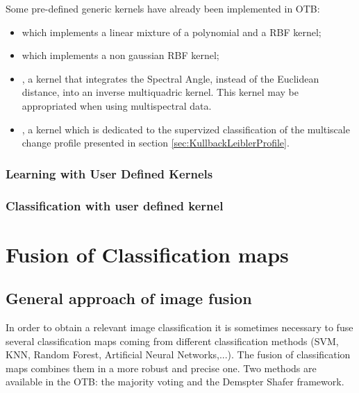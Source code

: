 Some pre-defined generic kernels have already been implemented in OTB:
\begin{itemize}
\item {} which implements a 
linear mixture
of a polynomial and a RBF kernel;
\item {} which implements a non
gaussian RBF kernel;
\item {}, a kernel that integrates
the Spectral Angle, instead of the Euclidean distance, into an inverse 
multiquadric kernel.
This kernel may be appropriated when using multispectral data.
\item {}, a kernel which is
dedicated to the supervized classification of the multiscale change profile
presented in section \ref{sec:KullbackLeiblerProfile}.
\end{itemize}

\subsubsection{Learning with User Defined Kernels}
\label{sec:Learningwithuserdefinedkernel}
\ifitkFullVersion

\fi

\subsubsection{Classification with user defined kernel}

\ifitkFullVersion

\fi




\section{Fusion of Classification maps}

\subsection{General approach of image fusion}
In order to obtain a relevant image classification it is sometimes necessary to 
fuse several classification maps coming from different classification methods 
(SVM, KNN, Random Forest, Artificial Neural Networks,...). The fusion of 
classification maps combines them in a more robust and precise one. Two methods are 
available in the OTB: the majority voting and the Demspter Shafer framework.


